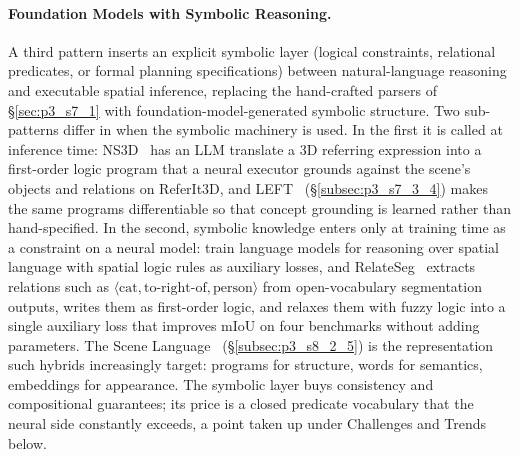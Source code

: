 \paragraph{Foundation Models with Symbolic Reasoning.}
A third pattern inserts an explicit symbolic layer (logical constraints, relational predicates, or formal planning specifications) between natural-language reasoning and executable spatial inference, replacing the hand-crafted parsers of §\ref{sec:p3_s7_1} with foundation-model-generated symbolic structure.
Two sub-patterns differ in when the symbolic machinery is used.
In the first it is called at inference time: NS3D~\cite{hsu2023ns3d} has an LLM translate a 3D referring expression into a first-order logic program that a neural executor grounds against the scene's objects and relations on ReferIt3D, and LEFT~\cite{hsu2023s} (§\ref{subsec:p3_s7_3_4}) makes the same programs differentiable so that concept grounding is learned rather than hand-specified.
In the second, symbolic knowledge enters only at training time as a constraint on a neural model: \citet{premsri2024neurosymbolic} train language models for reasoning over spatial language with spatial logic rules as auxiliary losses, and RelateSeg~\cite{lin2025neuro} extracts relations such as $\langle\text{cat}, \text{to-right-of}, \text{person}\rangle$ from open-vocabulary segmentation outputs, writes them as first-order logic, and relaxes them with fuzzy logic into a single auxiliary loss that improves mIoU on four benchmarks without adding parameters.
The Scene Language~\cite{zhang2025scenelanguage} (§\ref{subsec:p3_s8_2_5}) is the representation such hybrids increasingly target: programs for structure, words for semantics, embeddings for appearance.
The symbolic layer buys consistency and compositional guarantees; its price is a closed predicate vocabulary that the neural side constantly exceeds, a point taken up under Challenges and Trends below.

